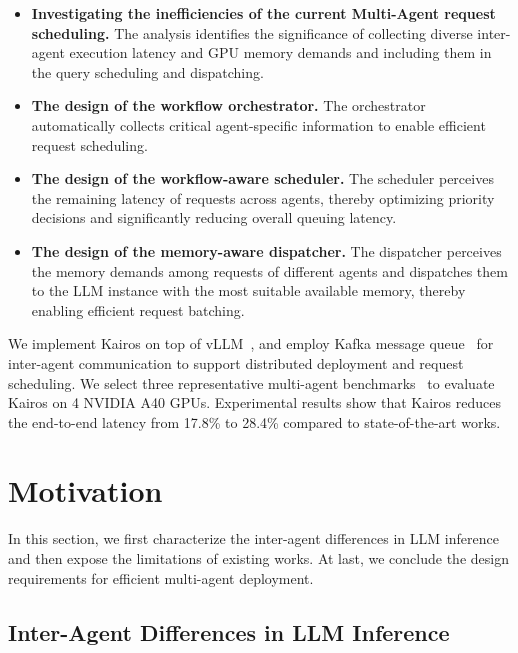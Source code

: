 \documentclass[sigplan,nonacm]{acmart}
\newcommand{\system}{Kairos}
\begin{document}
\begin{itemize}
    \item \textbf{Investigating the inefficiencies of the current Multi-Agent request scheduling.} The analysis identifies the significance of collecting diverse inter-agent execution latency and GPU memory demands and including them in the query scheduling and dispatching. 
    \item \textbf{The design of the workflow orchestrator.} The orchestrator automatically collects critical agent-specific information to enable efficient request scheduling.
    \item \textbf{The design of the workflow-aware scheduler.} The scheduler perceives the remaining latency of requests across agents, thereby optimizing priority decisions and significantly reducing overall queuing latency.
    \item \textbf{The design of the memory-aware dispatcher.} The dispatcher perceives the memory demands among requests of different agents and dispatches them to the LLM instance with the most suitable available memory, thereby enabling efficient request batching.
\end{itemize}

We implement \system{} on top of vLLM~\cite{kwon2023efficient}, and employ Kafka message queue~\cite{kafka} for inter-agent communication to support distributed deployment and request scheduling. We select three representative multi-agent benchmarks~\cite{wu2023autogenenablingnextgenllm,hong2024metagpt,gao2024agentscope} to evaluate \system{} on 4 NVIDIA A40 GPUs. 
Experimental results show that \system{} reduces the end-to-end latency from 17.8\% to 28.4\% compared to state-of-the-art works.
\section{Motivation}
In this section, we first characterize the inter-agent differences in LLM inference and then expose the limitations of existing works. At last, we conclude the design requirements for efficient multi-agent deployment.

\subsection{Inter-Agent Differences in LLM Inference}
\end{document}
